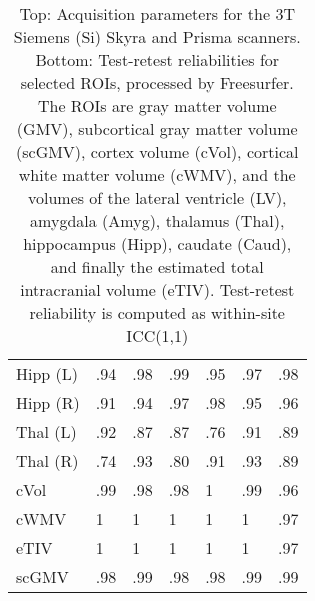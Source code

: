 \documentclass{article}
\begin{document}
\begin{table}
{\begin{tabular}{lllllll}
Hipp (L)              &                 .94 &                 .98 &               .99 &                .95 &                .97 &                .98 \\
Hipp (R)              &                 .91 &                 .94 &               .97 &                .98 &                .95 &                .96 \\
Thal (L)              &                 .92 &                 .87 &               .87 &                .76 &                .91 &                .89 \\
Thal (R)              &                 .74 &                 .93 &               .80 &                .91 &                .93 &                .89 \\
cVol                  &                 .99 &                 .98 &               .98 &                1   &                .99 &                .96 \\
cWMV                  &                 1   &                 1   &               1   &                1   &                1   &                .97 \\
eTIV                  &                 1   &                 1   &               1   &                1   &                1   &                .97 \\
scGMV                 &                 .98 &                 .99 &               .98 &                .98 &                .99 &                .99 \\
\bottomrule
\end{tabular}}
\fi
\caption{Top: Acquisition parameters for the 3T Siemens (Si) Skyra and Prisma scanners.  Bottom: Test-retest reliabilities for selected ROIs, processed by Freesurfer. The ROIs are gray matter volume (GMV), subcortical gray matter volume (scGMV), cortex volume (cVol), cortical white matter volume (cWMV), and the volumes of the lateral ventricle (LV), amygdala (Amyg), thalamus (Thal), hippocampus (Hipp), caudate (Caud), and finally the estimated total intracranial volume (eTIV). Test-retest reliability is computed as within-site ICC(1,1)} 
\label{tab:acquisition3}

\end{table}
\end{document}
